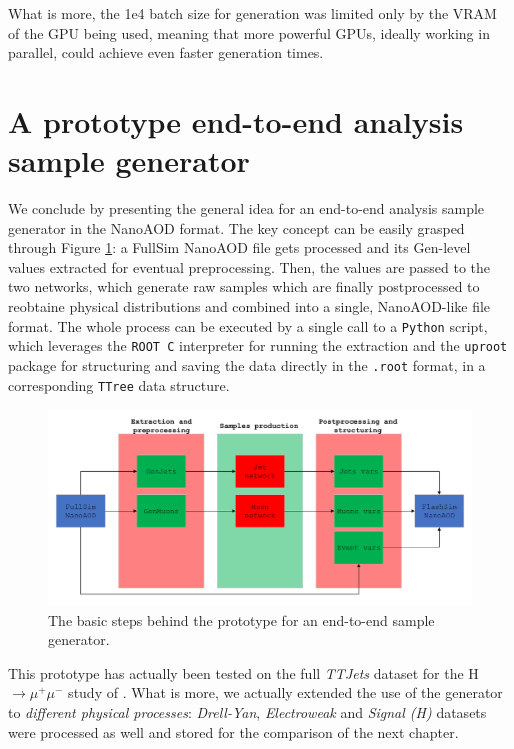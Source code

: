 What is more, the 1e4 batch size for generation was limited only by the VRAM of the GPU being used, meaning that more powerful GPUs, ideally working in parallel, could achieve even faster generation times.


\section{A prototype end-to-end analysis sample generator}

We conclude by presenting the general idea for an end-to-end analysis sample generator in the NanoAOD format. The key concept can be easily grasped through Figure \ref{fig:endtoend}: a FullSim NanoAOD file gets processed and its Gen-level values extracted for eventual preprocessing. Then, the values are passed to the two networks, which generate raw samples which are finally postprocessed to reobtaine physical distributions and combined into a single, NanoAOD-like file format. The whole process can be executed by a single call to a \texttt{Python} script, which leverages the \texttt{ROOT C} interpreter for running the extraction and the \texttt{uproot} package for structuring and saving the data directly in the \texttt{.root} format, in a corresponding \texttt{TTree} data structure.

\begin{figure}
    \centering
    \includegraphics[width=\linewidth]{gfx/ch5/endtoend.pdf}
    \caption[end-toend sample generator]{The basic steps behind the prototype for an end-to-end sample generator.}
    \label{fig:endtoend}
\end{figure}

This prototype has actually been tested on the full \emph{TTJets} dataset for the H$\rightarrow\mu^+\mu^-$ study of \cite{CMS-PAS-HIG-19-006}. What is more, we actually extended the use of the generator to \emph{different physical processes}: \emph{Drell-Yan}, \emph{Electroweak} and \emph{Signal (H)} datasets were processed as well and stored for the comparison of the next chapter.


